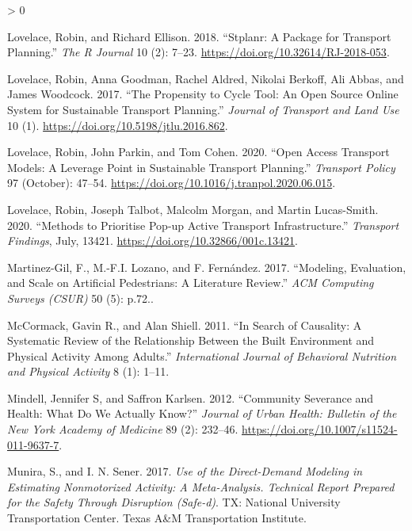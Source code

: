 \documentclass[galley]{jtlu-article-2col}
\newlength{\cslhangindent}
\newenvironment{CSLReferences}[2] %
 {%
  \setlength{\parindent}{0pt}
  \ifodd #1 \everypar{\setlength{\hangindent}{\cslhangindent}}\ignorespaces\fi
  \ifnum #2 > 0
  \setlength{\parskip}{#2\baselineskip}
  \fi
 }%
 {}
\begin{document}
\begin{CSLReferences}{1}{0}
\leavevmode\hypertarget{ref-lovelace_stplanr_2018}{}%
Lovelace, Robin, and Richard Ellison. 2018. {``Stplanr: {A Package} for {Transport Planning}.''} \emph{The R Journal} 10 (2): 7--23. \url{https://doi.org/10.32614/RJ-2018-053}.

\leavevmode\hypertarget{ref-lovelace_propensity_2017}{}%
Lovelace, Robin, Anna Goodman, Rachel Aldred, Nikolai Berkoff, Ali Abbas, and James Woodcock. 2017. {``The {Propensity} to {Cycle Tool}: {An} Open Source Online System for Sustainable Transport Planning.''} \emph{Journal of Transport and Land Use} 10 (1). \url{https://doi.org/10.5198/jtlu.2016.862}.

\leavevmode\hypertarget{ref-lovelace_open_2020}{}%
Lovelace, Robin, John Parkin, and Tom Cohen. 2020. {``Open Access Transport Models: {A} Leverage Point in Sustainable Transport Planning.''} \emph{Transport Policy} 97 (October): 47--54. \url{https://doi.org/10.1016/j.tranpol.2020.06.015}.

\leavevmode\hypertarget{ref-lovelace_methods_2020}{}%
Lovelace, Robin, Joseph Talbot, Malcolm Morgan, and Martin Lucas-Smith. 2020. {``Methods to {Prioritise Pop}-up {Active Transport Infrastructure}.''} \emph{Transport Findings}, July, 13421. \url{https://doi.org/10.32866/001c.13421}.

\leavevmode\hypertarget{ref-martinez-gil_modeling_2017}{}%
Martinez-Gil, F., M.-F.I. Lozano, and F. Fernández. 2017. {``Modeling, Evaluation, and Scale on Artificial Pedestrians: A Literature Review.''} \emph{ACM Computing Surveys (CSUR)} 50 (5): p.72..

\leavevmode\hypertarget{ref-mccormack_search_2011}{}%
McCormack, Gavin R., and Alan Shiell. 2011. {``In Search of Causality: A Systematic Review of the Relationship Between the Built Environment and Physical Activity Among Adults.''} \emph{International Journal of Behavioral Nutrition and Physical Activity} 8 (1): 1--11.

\leavevmode\hypertarget{ref-mindell_community_2012}{}%
Mindell, Jennifer S, and Saffron Karlsen. 2012. {``Community Severance and Health: What Do We Actually Know?''} \emph{Journal of Urban Health: Bulletin of the New York Academy of Medicine} 89 (2): 232--46. \url{https://doi.org/10.1007/s11524-011-9637-7}.

\leavevmode\hypertarget{ref-munira_use_2017}{}%
Munira, S., and I. N. Sener. 2017. \emph{Use of the Direct-Demand Modeling in Estimating Nonmotorized Activity: {A} Meta-Analysis. {Technical} Report Prepared for the Safety Through Disruption (Safe-d)}. {TX: National University Transportation Center. Texas A\&M Transportation Institute}.


\end{CSLReferences}
\end{document}
